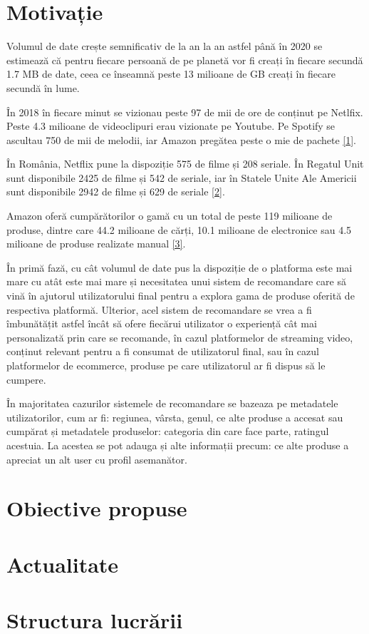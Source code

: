 \section{Motivație}

Volumul de date crește semnificativ de la an la an astfel până în 2020 se estimează că pentru fiecare persoană de pe planetă vor fi creați în fiecare secundă 1.7 MB de date, ceea ce înseamnă peste 13 milioane de GB creați în fiecare secundă în lume.

În 2018 în fiecare minut se vizionau peste 97 de mii de ore de conținut pe Netlfix. Peste 4.3 milioane de videoclipuri erau vizionate pe Youtube. Pe Spotify se ascultau 750 de mii de melodii, iar Amazon pregătea peste o mie de pachete \hyperlink{domo}{[1]}.

\vspace{5mm}

În România, Netflix pune la dispoziție 575 de filme și 208 seriale. În Regatul Unit sunt disponibile 2425 de filme și 542 de seriale, iar în Statele Unite Ale Americii sunt disponibile 2942 de filme și 629 de seriale \hyperlink{finder}{[2]}.

Amazon oferă cumpărătorilor o gamă cu un total de peste 119 milioane de produse, dintre care 44.2 milioane de cărți, 10.1 milioane de electronice sau 4.5 milioane de produse realizate manual \hyperlink{scrapehero}{[3]}.

\vspace{5mm}

În primă fază, cu cât volumul de date pus la dispoziție de o platforma este mai mare cu atât este mai mare și necesitatea unui sistem de recomandare care să vină în ajutorul utilizatorului final pentru a explora gama de produse oferită de respectiva platformă. Ulterior, acel sistem de recomandare se vrea a fi îmbunătățit astfel încât să ofere fiecărui utilizator o experiență cât mai personalizată prin care se recomande, în cazul platformelor de streaming video, conținut relevant pentru a fi consumat de utilizatorul final, sau în cazul platformelor de ecommerce, produse pe care utilizatorul ar fi dispus să le cumpere.

\vspace{5mm}

În majoritatea cazurilor sistemele de recomandare se bazeaza pe metadatele utilizatorilor, cum ar fi: regiunea, vârsta, genul, ce alte produse a accesat sau cumpărat și metadatele produselor: categoria din care face parte, ratingul acestuia. La acestea se pot adauga și alte informații precum: ce alte produse a apreciat un alt user cu profil asemanător.
\section{Obiective propuse}


\section{Actualitate}


\section{Structura lucrării}